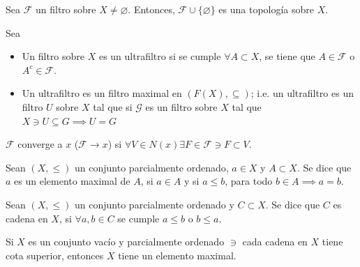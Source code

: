 \begin{cajita}
    \begin{nota}[Escolio]
        Sea $\mathcal{F}$ un filtro sobre $X\neq\varnothing$. Entonces,  $\mathcal{F}\cup \{\varnothing\}$ es una topología sobre $X$. 
    \end{nota}    
\end{cajita}

\begin{definicion}[Ultrafiltros]
    Sea 
    \begin{itemize}
        \item Un filtro sobre $X$ es un ultrafiltro  si se cumple $\forall A\subset X $, se tiene que $A\in \mathcal{F}$ o $A^c\in \mathcal{F}$.
        \item Un ultrafiltro es un filtro maximal en $(F(X), \subseteq)$; i.e. un ultrafiltro es un filtro $U$ sobre $X$ tal que si $\mathcal{G}$ es un filtro sobre $X$ tal que $X\ni U\subseteq G\implies U=G$ 
    \end{itemize}
\end{definicion}

\begin{definicion}
    $\mathcal{F}$ converge a $x$ ($\mathcal{F}\to x$) si $\forall V\in N(x)\exists F\in \mathcal{F}\ni F\subset V$. 
\end{definicion}

\begin{definicion}
    Sean $(X,\leq)$ un conjunto parcialmente ordenado, $a\in X$ y $A\subset X$. Se dice que $a$ es un elemento maximal de $A$, si $a\in A$ y si $a\leq b$, para todo $b\in A\implies a=b$.  
\end{definicion}

\begin{definicion}
    Sean $(X,\leq)$ un conjunto parcialmente ordenado y $C\subset X$. Se dice que $C$ es cadena en $X$, si $\forall a,b\in C$ se cumple $a\leq b$ o $b\leq a$.  
\end{definicion}

\begin{lema}[De Zorn]
    Si $X$ es un conjunto vacío y parcialmente ordenado $\ni$ cada cadena en $X$ tiene cota superior, entonces $X$ tiene un elemento maximal. 
\end{lema}


